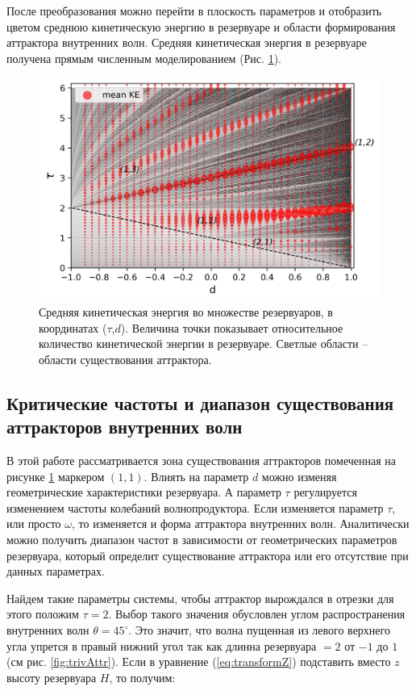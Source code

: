 После преобразования можно перейти в плоскость параметров и отобразить цветом среднюю кинетическую энергию в резервуаре \cite{Maas1997} и области формирования аттрактора внутренних волн. Средняя кинетическая энергия в резервуаре получена прямым численным моделированием (Рис. \ref{fig:diagramm}). 

\begin{figure}
    \centering
    \includegraphics{pics/KEandLyap.png}
    \caption{Средняя кинетическая энергия во множестве резервуаров, в координатах ($\tau$,$d$). Величина точки показывает относительное количество кинетической энергии в резервуаре. Светлые области -- области существования аттрактора. }
    \label{fig:diagramm}
\end{figure}

\subsection{Критические частоты и диапазон существования аттракторов внутренних волн}

В этой работе рассматривается зона существования аттракторов помеченная на рисунке \ref{fig:diagramm} маркером $(1,1)$. Влиять на параметр $d$ можно изменяя геометрические характеристики резервуара. А параметр $\tau$ регулируется изменением частоты колебаний волнопродуктора. Если изменяется параметр $\tau$, или просто $\omega$, то изменяется и форма аттрактора внутренних волн. Аналитически можно получить диапазон частот в зависимости от геометрических параметров резервуара, который определит существование аттрактора или его отсутствие при данных параметрах.

Найдем такие параметры системы, чтобы аттрактор вырождался в отрезки для этого положим $\tau=2$. Выбор такого значения обусловлен углом распространения внутренних волн $\theta = 45^{\circ}$. Это значит, что волна пущенная из левого верхнего угла упрется в правый нижний угол так как длинна резервуара $=2$ от $-1$ до $1$(см рис. \ref{fig:trivAttr}). Если в уравнение (\ref{eq:transformZ}) подставить вместо $z$ высоту резервуара $H$, то получим:


